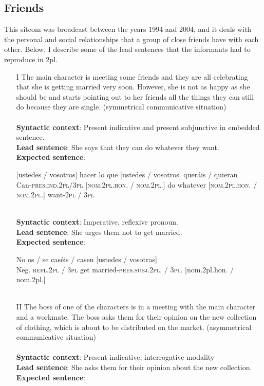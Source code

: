 \documentclass[output=paper]{LSP/langsci}
\begin{document}
\subsection{Friends}
This sitcom was broadcast between the years 1994 and 2004, and it deals with the personal and social relationships that a group of close friends have with each other. Below, I describe some of the lead sentences that the informants had to reproduce in 2pl.

\begin{enumerate}
\item [I] The main character is meeting some friends and they are all celebrating that she is getting married very soon. However, she is not as happy as she should be and starts pointing out to her friends all the things they can still do because they are single. (symmetrical communicative situation)\\
\\
\textbf{Syntactic context}: Present indicative and present subjunctive in embedded sentence.\\
\textbf{Lead sentence}: She says that they can do whatever they want. \\
\textbf{Expected sentence}: 

\ea
{} {[ustedes / vosotros]} hacer {lo que} {[ustedes / vosotros]} {queráis / quieran}\\
{Can-\textsc{pres.ind.2pl/3pl}} \textsc{[nom.2pl.hon. / nom.2pl.]} do whatever \textsc{[nom.2pl.hon. / nom.2pl.]} want-\textsc{2pl / 3pl}\\
\\
\z

\textbf{Syntactic context}: Imperative, reflexive pronoun.\\
\textbf{Lead sentence}: She urges them not to get married.\\ 
\textbf{Expected sentence}:

\ea
\gll No   {os / se}               {caséis / casen}            {[ustedes / vosotras]}\\
Neg. {\textsc{refl.2pl / 3pl}} {get married-\textsc{pres.subj.2pl. / 3pl.}} {[nom.2pl.hon. / nom.2pl.]}\\
\\
\z

\item [II] The boss of one of the characters is in a meeting with the main character and a workmate. The boss asks them for their opinion on the new collection of clothing, which is about to be distributed on the market. (asymmetrical communicative situation)\\
\\
\textbf{Syntactic context}: Present indicative, interrogative modality\\
\textbf{Lead sentence}: She asks them for their opinion about the new collection.\\
\textbf{Expected sentence}:


\end{enumerate}
\end{document}
